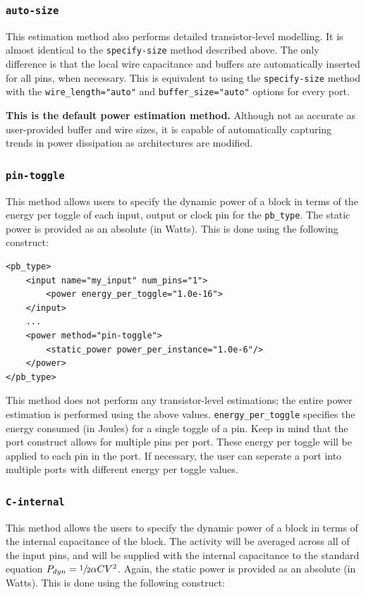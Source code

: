 \documentclass[letterpaper,twoside,10pt]{article}
\begin{document}
\subsubsection{\texttt{auto-size}}
This estimation method also performs detailed transistor-level modelling.  It is almost identical to the \texttt{specify-size} method described above.  The only difference is that the local wire capacitance and buffers are automatically inserted for all pins, when necessary.  This is equivalent to using the \texttt{specify-size} method with the \texttt{wire\_length="auto"} and 
\texttt{buffer\_size="auto"} options for every port.

\textbf{This is the default power estimation method.}  Although not as accurate as user-provided buffer and wire sizes, it is capable of automatically capturing trends in power dissipation as architectures are modified.  

\subsubsection{\texttt{pin-toggle}}
This method allows users to specify the dynamic power of a block in terms of the energy per toggle of each input, output or clock pin for the \texttt{pb\_type}.  The static power is provided as an absolute (in Watts). This is done using the following construct:

\begin{BVerbatim}[bgcolor=LightGray, boxwidth=\textwidth] 
<pb_type>
	<input name="my_input" num_pins="1">
		<power energy_per_toggle="1.0e-16">
	</input>
	...
	<power method="pin-toggle">
		<static_power power_per_instance="1.0e-6"/>
	</power>
</pb_type>
\end{BVerbatim}

This method does not perform any transistor-level estimations; the entire power estimation is performed using the above values.  \texttt{energy\_per\_toggle} specifies the energy consumed (in Joules) for a single toggle of a pin.  Keep in mind that the port construct allows for multiple pins per port.  These energy per toggle will be applied to each pin in the port.  If necessary, the user can seperate a port into multiple ports with different energy per toggle values.

\subsubsection{\texttt{C-internal}}
This method allows the users to specify the dynamic power of a block in terms of the internal capacitance of the block.  The activity will be averaged across all of the input pins, and will be supplied with the internal capacitance to the standard equation $P_{dyn}=\sfrac{1}{2}\alpha CV^2$.  Again, the static power is provided as an absolute (in Watts).  This is done using the following construct:
\end{document}
